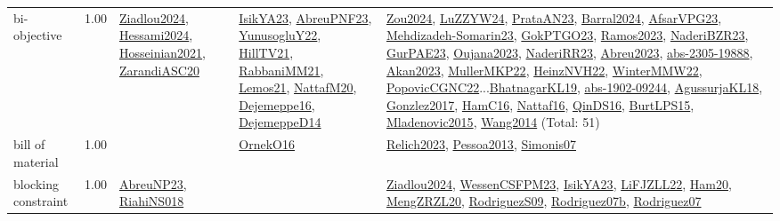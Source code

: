 {\begin{longtable}{p{3cm}r>{\raggedright\arraybackslash}p{6cm}>{\raggedright\arraybackslash}p{6cm}>{\raggedright\arraybackslash}p{8cm}}
\index{bi-objective}\index{Concepts!bi-objective}bi-objective &  1.00 & \hyperref[detail:Ziadlou2024]{Ziadlou2024}, \hyperref[detail:Hessami2024]{Hessami2024}, \hyperref[detail:Hosseinian2021]{Hosseinian2021}, \hyperref[detail:ZarandiASC20]{ZarandiASC20} & \hyperref[detail:IsikYA23]{IsikYA23}, \hyperref[detail:AbreuPNF23]{AbreuPNF23}, \hyperref[detail:YunusogluY22]{YunusogluY22}, \hyperref[detail:HillTV21]{HillTV21}, \hyperref[detail:RabbaniMM21]{RabbaniMM21}, \hyperref[detail:Lemos21]{Lemos21}, \hyperref[detail:NattafM20]{NattafM20}, \hyperref[detail:Dejemeppe16]{Dejemeppe16}, \hyperref[detail:DejemeppeD14]{DejemeppeD14} & \hyperref[detail:Zou2024]{Zou2024}, \hyperref[detail:LuZZYW24]{LuZZYW24}, \hyperref[detail:PrataAN23]{PrataAN23}, \hyperref[detail:Barral2024]{Barral2024}, \hyperref[detail:AfsarVPG23]{AfsarVPG23}, \hyperref[detail:Mehdizadeh-Somarin23]{Mehdizadeh-Somarin23}, \hyperref[detail:GokPTGO23]{GokPTGO23}, \hyperref[detail:Ramos2023]{Ramos2023}, \hyperref[detail:NaderiBZR23]{NaderiBZR23}, \hyperref[detail:GurPAE23]{GurPAE23}, \hyperref[detail:Oujana2023]{Oujana2023}, \hyperref[detail:NaderiRR23]{NaderiRR23}, \hyperref[detail:Abreu2023]{Abreu2023}, \hyperref[detail:abs-2305-19888]{abs-2305-19888}, \hyperref[detail:Akan2023]{Akan2023}, \hyperref[detail:MullerMKP22]{MullerMKP22}, \hyperref[detail:HeinzNVH22]{HeinzNVH22}, \hyperref[detail:WinterMMW22]{WinterMMW22}, \hyperref[detail:PopovicCGNC22]{PopovicCGNC22}...\hyperref[detail:BhatnagarKL19]{BhatnagarKL19}, \hyperref[detail:abs-1902-09244]{abs-1902-09244}, \hyperref[detail:AgussurjaKL18]{AgussurjaKL18}, \hyperref[detail:Gonzlez2017]{Gonzlez2017}, \hyperref[detail:HamC16]{HamC16}, \hyperref[detail:Nattaf16]{Nattaf16}, \hyperref[detail:QinDS16]{QinDS16}, \hyperref[detail:BurtLPS15]{BurtLPS15}, \hyperref[detail:Mladenovic2015]{Mladenovic2015}, \hyperref[detail:Wang2014]{Wang2014} (Total: 51)\\
\index{bill of material}\index{Concepts!bill of material}bill of material &  1.00 &  & \hyperref[detail:OrnekO16]{OrnekO16} & \hyperref[detail:Relich2023]{Relich2023}, \hyperref[detail:Pessoa2013]{Pessoa2013}, \hyperref[detail:Simonis07]{Simonis07}\\
\index{blocking constraint}\index{Concepts!blocking constraint}blocking constraint &  1.00 & \hyperref[detail:AbreuNP23]{AbreuNP23}, \hyperref[detail:RiahiNS018]{RiahiNS018} &  & \hyperref[detail:Ziadlou2024]{Ziadlou2024}, \hyperref[detail:WessenCSFPM23]{WessenCSFPM23}, \hyperref[detail:IsikYA23]{IsikYA23}, \hyperref[detail:LiFJZLL22]{LiFJZLL22}, \hyperref[detail:Ham20]{Ham20}, \hyperref[detail:MengZRZL20]{MengZRZL20}, \hyperref[detail:RodriguezS09]{RodriguezS09}, \hyperref[detail:Rodriguez07b]{Rodriguez07b}, \hyperref[detail:Rodriguez07]{Rodriguez07}\\

\end{longtable}}
